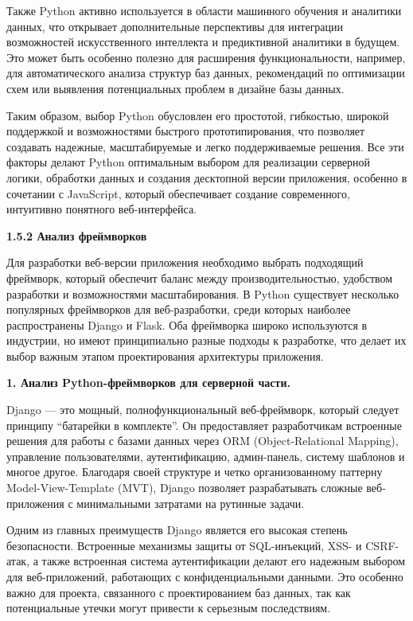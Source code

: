 Также Python активно используется в области машинного обучения и аналитики данных, что открывает дополнительные перспективы для интеграции возможностей искусственного интеллекта и предиктивной аналитики в будущем. Это может быть особенно полезно для расширения функциональности, например, для автоматического анализа структур баз данных, рекомендаций по оптимизации схем или выявления потенциальных проблем в дизайне базы данных.

Таким образом, выбор Python обусловлен его простотой, гибкостью, широкой поддержкой и возможностями быстрого прототипирования, что позволяет создавать надежные, масштабируемые и легко поддерживаемые решения. Все эти факторы делают Python оптимальным выбором для реализации серверной логики, обработки данных и создания десктопной версии приложения, особенно в сочетании с JavaScript, который обеспечивает создание современного, интуитивно понятного веб-интерфейса.

\textbf{1.5.2 Анализ фреймворков}

Для разработки веб-версии приложения необходимо выбрать подходящий фреймворк, который обеспечит баланс между производительностью, удобством разработки и возможностями масштабирования. В Python существует несколько популярных фреймворков для веб-разработки, среди которых наиболее распространены Django и Flask. Оба фреймворка широко используются в индустрии, но имеют принципиально разные подходы к разработке, что делает их выбор важным этапом проектирования архитектуры приложения.

\textbf{1. Анализ Python-фреймворков для серверной части.}

Django — это мощный, полнофункциональный веб-фреймворк, который следует принципу “батарейки в комплекте”. Он предоставляет разработчикам встроенные решения для работы с базами данных через ORM (Object-Relational Mapping), управление пользователями, аутентификацию, админ-панель, систему шаблонов и многое другое. Благодаря своей структуре и четко организованному паттерну Model-View-Template (MVT), Django позволяет разрабатывать сложные веб-приложения с минимальными затратами на рутинные задачи.

Одним из главных преимуществ Django является его высокая степень безопасности. Встроенные механизмы защиты от SQL-инъекций, XSS- и CSRF-атак, а также встроенная система аутентификации делают его надежным выбором для веб-приложений, работающих с конфиденциальными данными. Это особенно важно для проекта, связанного с проектированием баз данных, так как потенциальные утечки могут привести к серьезным последствиям.

